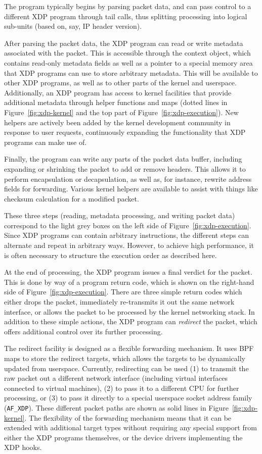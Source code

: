 \documentclass[sigconf]{acmart}
\begin{document}
The program typically begins by parsing packet data, and can pass control to a
different XDP program through tail calls, thus splitting processing into
logical sub-units (based on, say, IP header version).

After parsing the packet data, the XDP program can read or write metadata
associated with the packet. This is accessible through the context object, which
contains read-only metadata fields as well as a pointer to a special memory area
that XDP programs can use to store arbitrary metadata. This will be available to
other XDP programs, as well as to other parts of the kernel and userspace.
Additionally, an XDP program has access to kernel facilities that provide
additional metadata through helper functions and maps (dotted lines in
Figure~\ref{fig:xdp-kernel} and the top part of Figure~\ref{fig:xdp-execution}).
New helpers are actively been added by the kernel development community in
response to user requests, continuously expanding the functionality that XDP
programs can make use of.

Finally, the program can write any parts of the packet data buffer, including
expanding or shrinking the packet to add or remove headers. This allows it to
perform encapsulation or decapsulation, as well as, for instance, rewrite
address fields for forwarding. Various kernel helpers are available to assist
with things like checksum calculation for a modified packet.

These three steps (reading, metadata processing, and writing packet data)
correspond to the light grey boxes on the left side of
Figure~\ref{fig:xdp-execution}. Since XDP programs can contain arbitrary
instructions, the different steps can alternate and repeat in arbitrary ways.
However, to achieve high performance, it is often necessary to structure the
execution order as described here.

At the end of processing, the XDP program issues a final verdict for the packet.
This is done by way of a program return code, which is shown on the right-hand
side of Figure~\ref{fig:xdp-execution}. There are three simple return codes
which either drops the packet, immediately re-transmits it out the same network
interface, or allows the packet to be processed by the kernel networking stack.
In addition to these simple actions, the XDP program can \emph{redirect} the
packet, which offers additional control over its further processing.

The redirect facility is designed as a flexible forwarding mechanism. It uses
BPF maps to store the redirect targets, which allows the targets to be
dynamically updated from userspace. Currently, redirecting can be used (1) to
transmit the raw packet out a different network interface (including virtual
interfaces connected to virtual machines), (2) to pass it to a different CPU for
further processing, or (3) to pass it directly to a special userspace socket
address family (\texttt{AF\_XDP}). These different packet paths are shown as
solid lines in Figure~\ref{fig:xdp-kernel}. The flexibility of the forwarding
mechanism means that it can be extended with additional target types without
requiring any special support from either the XDP programs themselves, or the
device drivers implementing the XDP hooks.
\end{document}
